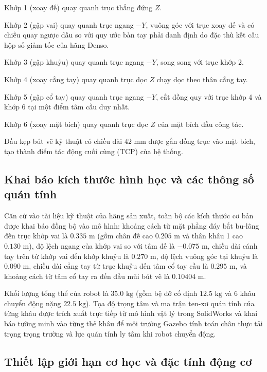 Khớp 1 (xoay đế) quay quanh trục thẳng đứng $Z$.

Khớp 2 (gập vai) quay quanh trục ngang $-Y$, vuông góc với trục xoay đế và có chiều quay ngược dấu so với quy ước bàn tay phải danh định do đặc thù kết cấu hộp số giảm tốc của hãng Denso.

Khớp 3 (gập khuỷu) quay quanh trục ngang $-Y$, song song với trục khớp 2.

Khớp 4 (xoay cẳng tay) quay quanh trục dọc $Z$ chạy dọc theo thân cẳng tay.

Khớp 5 (gập cổ tay) quay quanh trục ngang $-Y$, cắt đồng quy với trục khớp 4 và khớp 6 tại một điểm tâm cầu duy nhất.

Khớp 6 (xoay mặt bích) quay quanh trục dọc $Z$ của mặt bích đầu công tác.

Đầu kẹp bút vẽ kỹ thuật có chiều dài $42\text{ mm}$ được gắn đồng trục vào mặt bích, tạo thành điểm tác động cuối cùng (TCP) của hệ thống.

\subsection{Khai báo kích thước hình học và các thông số quán tính}

Căn cứ vào tài liệu kỹ thuật của hãng sản xuất, toàn bộ các kích thước cơ bản được khai báo đồng bộ vào mô hình: khoảng cách từ mặt phẳng đáy bắt bu-lông đến trục khớp vai là $0.335\text{ m}$ (gồm chân đế cao $0.205\text{ m}$ và thân khâu 1 cao $0.130\text{ m}$), độ lệch ngang của khớp vai so với tâm đế là $-0.075\text{ m}$, chiều dài cánh tay trên từ khớp vai đến khớp khuỷu là $0.270\text{ m}$, độ lệch vuông góc tại khuỷu là $0.090\text{ m}$, chiều dài cẳng tay từ trục khuỷu đến tâm cổ tay cầu là $0.295\text{ m}$, và khoảng cách từ tâm cổ tay ra đến đầu mũi bút vẽ là $0.10404\text{ m}$.

Khối lượng tổng thể của robot là $35.0\text{ kg}$ (gồm bệ đỡ cố định $12.5\text{ kg}$ và 6 khâu chuyển động nặng $22.5\text{ kg}$). Tọa độ trọng tâm và ma trận ten-xơ quán tính của từng khâu được trích xuất trực tiếp từ mô hình vật lý trong SolidWorks và khai báo tường minh vào từng thẻ khâu để môi trường Gazebo tính toán chân thực tải trọng trọng trường và lực quán tính ly tâm khi robot chuyển động.

\subsection{Thiết lập giới hạn cơ học và đặc tính động cơ}

